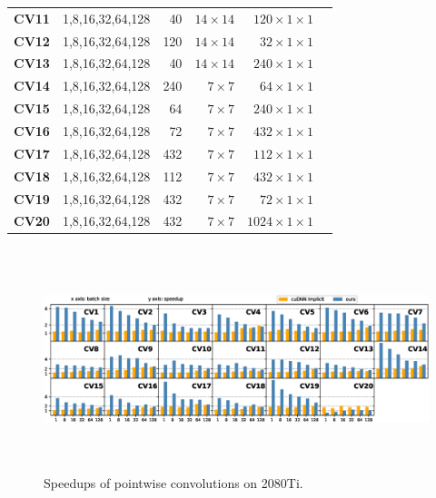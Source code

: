 \begin{table}[]
\begin{threeparttable}
\begin{tabular}{lrrrrr}
\textbf{CV11} & 1,8,16,32,64,128  & 40    & $14\times 14$   & $120 \times 1\times 1$\\
\textbf{CV12} & 1,8,16,32,64,128  & 120   & $14\times 14$   & $32 \times 1\times 1$\\
\textbf{CV13} & 1,8,16,32,64,128  & 40    & $14\times 14$   & $240 \times 1\times 1$\\
\textbf{CV14} & 1,8,16,32,64,128  & 240   & $7\times 7$     & $64  \times 1\times 1$\\
\textbf{CV15} & 1,8,16,32,64,128  & 64    & $7\times 7$     & $240 \times 1\times 1$\\
\textbf{CV16} & 1,8,16,32,64,128  & 72    & $7\times 7$     & $432 \times 1\times 1$\\
\textbf{CV17} & 1,8,16,32,64,128  & 432   & $7\times 7$     & $112 \times 1\times 1$\\
\textbf{CV18} & 1,8,16,32,64,128  & 112   & $7\times 7$     & $432 \times 1\times 1$\\
\textbf{CV19} & 1,8,16,32,64,128  & 432   & $7\times 7$     & $72 \times 1\times 1$\\
\textbf{CV20} & 1,8,16,32,64,128  & 432   & $7\times 7$     & $1024 \times 1\times 1$\\

\bottomrule
\end{tabular}
\end{threeparttable}
\end{table}

\begin{figure}
	\centering
    \includegraphics[width=\textwidth,height=6.5cm]{./figure/pwspeeduprtx.eps}
    \caption{Speedups of pointwise convolutions on 2080Ti.} \label{fig:pwspeeduprtx}
\end{figure}

